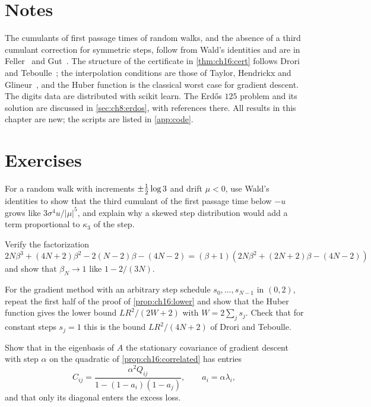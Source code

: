 \section*{Notes}

The cumulants of first passage times of random walks, and the absence of a
third cumulant correction for symmetric steps, follow from Wald's identities
and are in Feller~\cite{feller1971} and Gut~\cite{gut1988}. The structure of the
certificate in \cref{thm:ch16:cert} follows Drori and Teboulle~\cite{drori2014};
the interpolation conditions are those of Taylor, Hendrickx and
Glineur~\cite{taylor2017}, and the Huber function is the classical worst case
for gradient descent. The digits data are distributed with scikit learn. The
Erd\H{o}s $125$ problem and its solution are discussed in \cref{sec:ch8:erdos},
with references there. All results in this chapter are new; the scripts are
listed in \cref{app:code}.

\section*{Exercises}

\begin{exercise}
For a random walk with increments $\pm\tfrac{1}{2}\log3$ and drift $\mu<0$, use Wald's
identities to show that the third cumulant of the first passage time below
$-u$ grows like $3\sigma^4u/|\mu|^5$, and explain why a skewed step distribution
would add a term proportional to $\kappa_3$ of the step.
\end{exercise}

\begin{exercise}
Verify the factorization
$2N\beta^3+(4N+2)\beta^2-2(N-2)\beta-(4N-2)=(\beta+1)(2N\beta^2+(2N+2)\beta-(4N-2))$ and
show that $\beta_N\to1$ like $1-2/(3N)$.
\end{exercise}

\begin{exercise}
For the gradient method with an arbitrary step schedule $s_0,\dots,s_{N-1}$ in $(0,2)$, repeat the first half of the proof of
\cref{prop:ch16:lower} and show that the Huber function gives the lower bound $LR^2/(2W+2)$ with
$W=2\sum_js_j$. Check that for constant steps $s_j=1$ this is the bound
$LR^2/(4N+2)$ of Drori and Teboulle.
\end{exercise}

\begin{exercise}
Show that in the eigenbasis of $A$ the stationary covariance of gradient
descent with step $\alpha$ on the quadratic of \cref{prop:ch16:correlated} has
entries
\[
  C_{ij}=\frac{\alpha^2Q_{ij}}{1-(1-a_i)(1-a_j)},\qquad a_i=\alpha\lambda_i,
\]
and that only its diagonal enters the excess loss.
\end{exercise}
